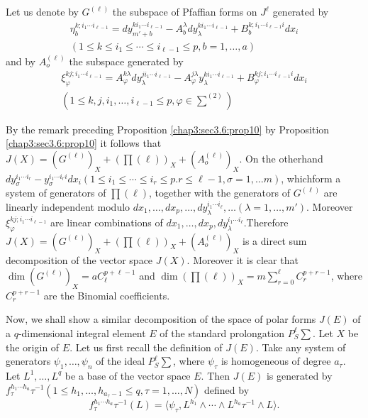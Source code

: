Let us denote by $G^{(\ell)}$ the subspace of Pfaffian forms on
$J^{\ell}$ generated by 
\begin{multline*}
  \eta_{b}^{k;i_1 \cdots i_{\ell -1}} = dy_{m'+b}^{ki_1 \cdots i_{\ell
      -1}} - A^{\lambda}_b dy_{\lambda}^{ki_1 \cdots i_{\ell -1}} +
  B_{b}^{k;i_1 \cdots i_{\ell -1}i} dx_i\\
  (1 \leq k \leq i_1 \leq\cdots \leq i_{\ell-1} \leq p , b=1 ,
  \ldots,a )
\end{multline*}
and by $A_o^{(\ell)}$ the subspace generated by
\begin{multline*}
  \xi_{\varphi}^{kj;i_1 \cdots i_{\ell -1}} = A^{k
    \lambda}_{\varphi} dy_{\lambda}^{ji_1 \cdots i_{\ell -1}} - A^{j
    \lambda}_{\varphi} y_{\lambda}^{ki_1 \cdots i_{\ell -1}} +
  B_{\varphi}^{kj;i_1 \cdots i_{\ell -1}i} dx_i\\ 
  \left(1 \leq k,j,i_1, \ldots, i_{\ell -1} \leq p , \varphi \in
  {\textstyle \sum^{(2)}}\right) 
\end{multline*}

By the remark preceding Proposition \ref{chap3:sec3.6:prop10} by
Proposition \ref{chap3:sec3.6:prop10} it 
follows that $J(X) = (G^{(\ell)})_X + (\prod (\ell))_X +
(A_o^{(\ell)})_X$. On the otherhand $dy_{\sigma}^{i_1 \cdots i_{r}}-
y_{\sigma}^{i_1 \cdots i_{r} i} dx_i (1 \leq i_1 \leq \cdots \leq i_r
\leq p.r \leq \ell -1 , \sigma =1 , \ldots m)$,  which\pageoriginale form a system
of generators of $\prod (\ell)$, together with the generators of
$G^{(\ell)}$ are linearly independent modulo $dx_1 , \ldots, dx_p,
\ldots, dy_{\lambda}^{i_1 \cdots i_{\ell}}, \ldots (\lambda =1, \ldots
, m')$. Moreover $\xi_{\varphi}^{kj;i_1 \cdots i_{\ell-1}}$ are linear
combinations of $dx_1, \ldots , dx_p, dy_{\lambda}^{i_1 \cdots i_{\ell
}}$.\break  Therefore $J(X) = (G^{(\ell)})_X + (\prod (\ell))_X +
(A_o^{(\ell)})_X$ is a direct sum decomposition of the vector space
$J(X)$. Moreover it is clear that $\dim (G^{(\ell)})_X= aC^{p+\ell
  -1}_{\ell}$ and $\dim (\prod (\ell))_X = m 
\sum\limits_{r=0}^{\ell} C^{p+r-1}_{r}$, where $C^{p+r-1}_{r}$ are the
Binomial coefficients. 

Now, we shall show a similar decomposition of the space of polar
forms $J(E)$ of a $q$-dimensional integral element $E$ of the standard
prolongation $P^{\ell}_S \sum$. Let $X$ be the origin of $E$. Let us
first recall the definition of $J(E)$. Take any system of generators
$\psi_1, \ldots, \psi_n$ of the ideal $P^{\ell}_S \sum$, where
$\psi_\tau$ is homogeneous of degree $a_\tau$. Let $L^1 , \ldots, L^q$ be
a base of the vector space $E$. Then $J(E)$ is generated by
$f_{\tau}^{h_1 \cdots h_a} \tau^{-1} (1 \leq h_1, \ldots,
h_{a_{\tau}-1} \leq q , \tau = 1, \ldots , N)$ defined by
$$
f_{\tau}^{h_1 \cdots h_a} \tau^{-1} (L) = \langle \psi_{\tau}, L^{h_1}
\wedge \cdots \wedge L^{h_a} \tau^{-1} \wedge L \rangle. 
$$  

